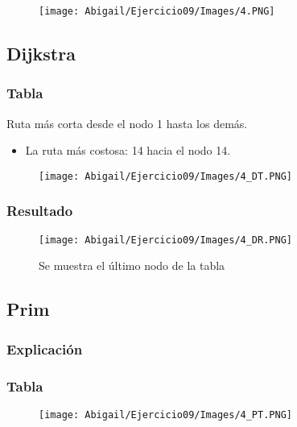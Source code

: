 \documentclass[12pt]{article}
\begin{document}
    \begin{figure}[h!]
      \centering
      \texttt{[image: Abigail/Ejercicio09/Images/4.PNG]}
    \end{figure} 

    \subsection{Dijkstra}

      \subsubsection{Tabla}
        Ruta más corta desde el nodo 1 hasta los demás.

        \begin{itemize}
          \item La ruta más costosa: 14 hacia el nodo 14.
        \end{itemize}

        \begin{figure}[h!]
          \centering
          \texttt{[image: Abigail/Ejercicio09/Images/4\_DT.PNG]}
        \end{figure} 

      \subsubsection{Resultado}
        \begin{figure}[h!]
          \centering
          \texttt{[image: Abigail/Ejercicio09/Images/4\_DR.PNG]}
          \caption{Se muestra el último nodo de la tabla}
        \end{figure} 

    \subsection{Prim}

      \subsubsection{Explicación}

      \subsubsection{Tabla}
        \begin{figure}[h!]
          \centering
          \texttt{[image: Abigail/Ejercicio09/Images/4\_PT.PNG]}
        \end{figure} 
\end{document}
